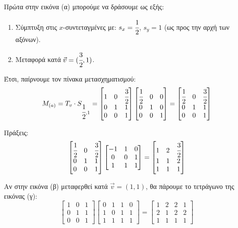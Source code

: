 \begin{solution}
Πρώτα στην εικόνα (α) μπορούμε να δράσουμε ως εξής:
\begin{enumerate}
    \item Σύμπτυξη στις $x$-συντεταγμένες με: \(s_x = \cfrac{1}{2}\), \(s_y = 1\) (ως προς την αρχή των αξόνων).
    \item Μεταφορά κατά \(\vec{v} = (\cfrac{3}{2},1) \).
\end{enumerate}

Έτσι, παίρνουμε τον πίνακα μετασχηματισμού:
\[
M_{(a)} = T_v \cdot S_{\cfrac{1}{2},1} = \begin{bmatrix}
1 & 0 & \cfrac{3}{2} \\
0 & 1 & 1 \\
0 & 0 & 1
\end{bmatrix}
\begin{bmatrix}
\cfrac{1}{2} & 0 & 0 \\
0 & 1 & 0 \\
0 & 0 & 1
\end{bmatrix} = \begin{bmatrix}
\cfrac{1}{2} & 0 & \cfrac{3}{2} \\
0 & 1 & 1 \\
0 & 0 & 1
\end{bmatrix}
\]

Πράξεις:
\[
\begin{bmatrix}
\cfrac{1}{2} & 0 & \cfrac{3}{2} \\
0 & 1 & 1 \\
0 & 0 & 1
\end{bmatrix}
\begin{bmatrix}
-1 & 1 & 0 \\
0 & 0 & 1 \\
1 & 1 & 1
\end{bmatrix} = \begin{bmatrix}
1 & 2 & \cfrac{3}{2} \\
1 & 1 & 2 \\
1 & 1 & 1
\end{bmatrix}
\]


Αν στην εικόνα (β) μεταφερθεί κατά \(\vec{v} = (1,1)\), θα πάρουμε το τετράγωνο της εικόνας (γ):
\[
\begin{bmatrix}
1 & 0 & 1 \\
0 & 1 & 1 \\
0 & 0 & 1
\end{bmatrix}
\begin{bmatrix}
0 & 1 & 1 & 0 \\
1 & 0 & 1 & 1 \\
1 & 1 & 1 & 1
\end{bmatrix} = \begin{bmatrix}
1 & 2 & 2 & 1 \\
2 & 1 & 2 & 2 \\
1 & 1 & 1 & 1
\end{bmatrix}
\]

\end{solution}
